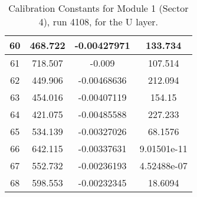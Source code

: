 \begin{table}[h]
{\begin{tabular}{|c|c|c|c|}
60	&	468.722	&	-0.00427971	&	133.734	\\	\hline
61	&	718.507	&	-0.009	&	107.514	\\	\hline
62	&	449.906	&	-0.00468636	&	212.094	\\	\hline
63	&	454.016	&	-0.00407119	&	154.15	\\	\hline
64	&	421.075	&	-0.00485588	&	227.233	\\	\hline
65	&	534.139	&	-0.00327026	&	68.1576	\\	\hline
66	&	642.115	&	-0.00337631	&	9.01501e-11	\\	\hline
67	&	552.732	&	-0.00236193	&	4.52488e-07	\\	\hline
68	&	598.553	&	-0.00232345	&	18.6094	\\	\hline

 \end{tabular}
        }
        \caption{Calibration Constants for Module 1 (Sector 4), run 4108, for the U layer.}
\end{table}



